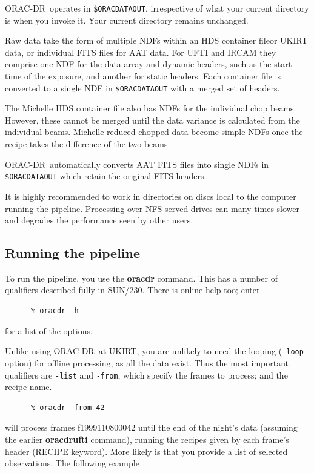 \documentclass[twoside,11pt]{article}
\newcommand{\xref}[3]{#1}
\newcommand{\xlabel}[1]{}
\renewcommand{\_}{\texttt{\symbol{95}}}
\newcommand{\ORACDR}{{\footnotesize ORAC-DR}}
\begin{document}
\ORACDR\ operates in {\tt \$ORAC\_DATA\_OUT}, irrespective of
what your current directory is when you invoke it.   Your current
directory remains unchanged.  

Raw data take the form of multiple NDFs within an \xref{HDS container
file}{sun92} for UKIRT data, or individual FITS files for AAT data.
For UFTI and IRCAM they comprise one NDF for the data
array and dynamic headers, such as the start time of the exposure, and
another for static headers.  Each container file is converted to a
single NDF in {\tt \$ORAC\_DATA\_OUT} with a merged set of headers.

The Michelle HDS container file also has NDFs for the individual chop
beams.  However, these cannot be merged until the data variance is
calculated from the individual beams.  Michelle reduced chopped data
become simple NDFs once the recipe takes the difference of the two
beams.

\ORACDR\ automatically converts AAT FITS files into single NDFs in
{\tt \$ORAC\_DATA\_OUT} which retain the original FITS headers.

It is highly recommended to work in directories on discs local to
the computer running the pipeline.  Processing over NFS-served drives
can many times slower and degrades the performance seen by other users.

\subsection{\xlabel{running_the_pipeline}Running the
pipeline\label{running_the_pipeline}}

To run the pipeline, you use the {\bf oracdr} command.  This has a
number of qualifiers described fully in \xref{SUN/230}{sun230}{oracdr}.
There is online help too; enter

\begin{verbatim}
      % oracdr -h
\end{verbatim}
for a list of the options.

Unlike using \ORACDR\ at UKIRT, you are unlikely to need the looping ({\tt -loop}
option) for offline processing, as all the data exist.  Thus the most
important qualifiers are {\tt -list} and {\tt -from}, which specify
the frames to process; and the recipe name.

\begin{verbatim}
      % oracdr -from 42
\end{verbatim}
will process frames f19991108\_00042 until the end of the night's data
(assuming the earlier {\bf oracdr\_ufti} command), running the recipes
given by each frame's header (RECIPE keyword).  More likely is that
you provide a list of selected observations.  The following example
\end{document}
